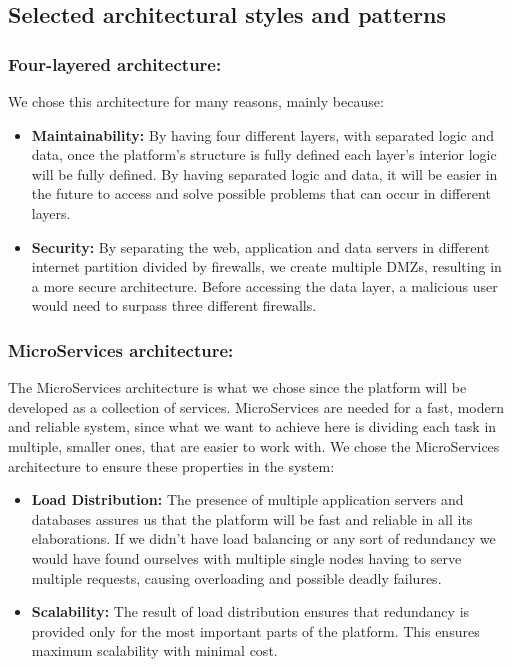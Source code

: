 \documentclass{article}
\begin{document}
{\newpage
\subsection{Selected architectural styles and patterns}
    \subsubsection{Four-layered architecture:} We chose this architecture for many reasons, mainly because:
    \begin{itemize}
        \item \textbf{Maintainability:} By having four different layers, with separated logic and data, once the platform's structure is fully defined
        each layer's interior logic will be fully defined.
        By having separated logic and data, it will be easier in the future to access and solve possible problems that can occur in different 
        layers.
        \item \textbf{Security:} By separating the web, application and data servers in different internet partition divided by firewalls, we create multiple
        DMZs, resulting in a more secure architecture. Before accessing the data layer, a malicious user would need to surpass three different firewalls. 
    \end{itemize}
    \subsubsection{MicroServices architecture:} The MicroServices architecture is what we chose since the platform will be developed as a collection of 
    services. MicroServices are needed for a fast, modern and reliable system, since what we want to achieve here is dividing each task in multiple, 
    smaller ones, that are easier to work with.
    We chose the MicroServices architecture to ensure these properties in the system:
    \begin{itemize}
        \item \textbf{Load Distribution:} The presence of multiple application servers and databases assures us that the platform will be fast 
        and reliable in all its elaborations. If we didn't have load balancing or any sort of redundancy we would have found ourselves with multiple
        single nodes having to serve multiple requests, causing overloading and possible deadly failures.
        \item \textbf{Scalability:} The result of load distribution ensures that redundancy is provided only for the most important parts of the platform.
        This ensures maximum scalability with minimal cost.
    \end{itemize}
}
\end{document}
